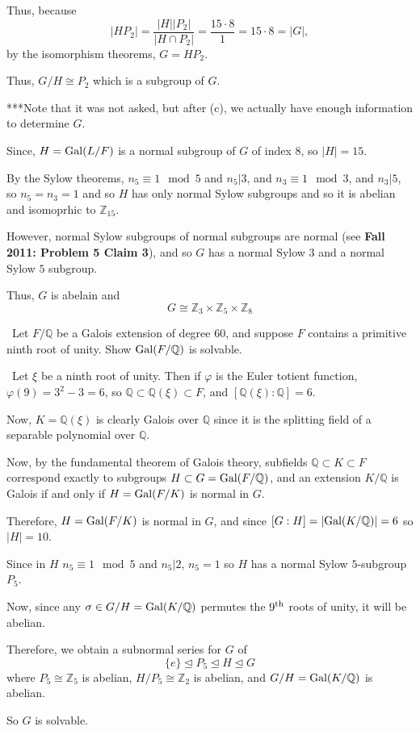 \documentclass[12pt]{AlgebraQual}
\begin{document}
\begin{solution}
\begin{enumerate}[label=(\alph*)]
    Thus, because $$|HP_2|=\frac{|H||P_2|}{|H\cap P_2|}=\frac{15\cdot 8}{1}=15\cdot 8=|G|,$$ by the isomorphism theorems, $G=HP_2.$

    Thus, $G/H\cong P_2$ which is a subgroup of $G$.
\end{enumerate}
\begin{mybox}
***Note that it was not asked, but after (c), we actually have enough information to determine $G.$

Since, $H=\text{Gal}(L/F)$ is a normal subgroup of $G$ of index $8$, so $|H|=15$.

By the Sylow theorems, $n_5\equiv 1\mod 5$ and $n_5|3$, and $n_3\equiv 1\mod 3$, and $n_3|5$, so $n_5=n_3=1$ and so $H$ has only normal Sylow subgroups and so it is abelian and isomoprhic to $\mathbb{Z}_{15}.$

However, normal Sylow subgroups of normal subgroups are normal (see \textbf{Fall 2011: Problem 5 Claim 3}), and so $G$ has a normal Sylow $3$ and a normal Sylow $5$ subgroup.

Thus, $G$ is abelain and $$G\cong\mathbb{Z}_3\times\mathbb{Z}_5\times\mathbb{Z}_8$$
\end{mybox}
\end{solution}
\newpage




\begin{problem} $\,$
Let $F/\mathbb{Q}$ be a Galois extension of degree $60$, and suppose $F$ contains a primitive ninth root of unity. Show $\text{Gal}(F/\mathbb{Q})$ is solvable.
\end{problem}


\begin{solution}$\,$
Let $\xi$ be a ninth root of unity. Then if $\varphi$ is the Euler totient function, $\varphi(9)=3^2-3=6$, so $\mathbb{Q}\subset \mathbb{Q}(\xi)\subset F$, and $[\mathbb{Q}(\xi):\mathbb{Q}]=6.$

Now, $K=\mathbb{Q}(\xi)$ is clearly Galois over $\mathbb{Q}$ since it is the splitting field of a separable polynomial over $\mathbb{Q}$.

Now, by the fundamental theorem of Galois theory, subfields $\mathbb{Q}\subset K\subset F$ correspond exactly to subgroups $H\subset G=\text{Gal}(F/\mathbb{Q})$, and an extension $K/\mathbb{Q}$ is Galois if and only if $H=\text{Gal}(F/K)$ is normal in $G$.

Therefore, $H=\text{Gal}(F/K)$ is normal in $G$, and since $[G:H]=|\text{Gal}(K/\mathbb{Q})|=6$ so $|H|=10$.

Since in $H$ $n_5\equiv 1\mod 5$ and $n_5|2$, $n_5=1$ so $H$ has a normal Sylow $5$-subgroup $P_5$.

Now, since any $\sigma\in G/H=\text{Gal}(K/\mathbb{Q})$ permutes the $9^\text{th}$ roots of unity, it will be abelian.

Therefore, we obtain a subnormal series for $G$ of $$\{e\}\trianglelefteq P_5\trianglelefteq H\trianglelefteq G$$ where $P_5\cong\mathbb{Z}_5$ is abelian, $H/P_5\cong\mathbb{Z}_2$ is abelian, and $G/H=\text{Gal}(K/\mathbb{Q})$ is abelian.

So $G$ is solvable.

\end{solution}
\newpage
\end{document}
